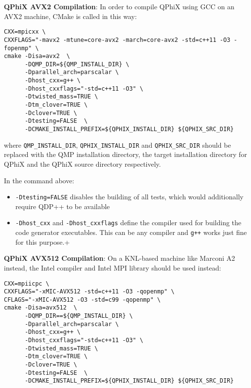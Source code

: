 \textbf{QPhiX AVX2 Compilation}: 
In order to compile QPhiX using GCC on an AVX2 machine, CMake is called in this way:
\begin{framed}
\begin{Verbatim}[fontsize=\small]
CXX=mpicxx \
CXXFLAGS="-mavx2 -mtune=core-avx2 -march=core-avx2 -std=c++11 -O3 -fopenmp" \
cmake -Disa=avx2  \
      -DQMP_DIR=${QMP_INSTALL_DIR} \
      -Dparallel_arch=parscalar \
      -Dhost_cxx=g++ \
      -Dhost_cxxflags="-std=c++11 -O3" \
      -Dtwisted_mass=TRUE \
      -Dtm_clover=TRUE \
      -Dclover=TRUE \
      -Dtesting=FALSE  \
      -DCMAKE_INSTALL_PREFIX=${QPHIX_INSTALL_DIR} ${QPHIX_SRC_DIR}
\end{Verbatim}
\end{framed}
where \texttt{QMP\_INSTALL\_DIR}, \texttt{QPHIX\_INSTALL\_DIR} and \texttt{QPHIX\_SRC\_DIR} should be replaced with the QMP installation directory, the target installation directory for QPhiX and the QPhiX source directory respectively.

In the command above:
\begin{itemize}
  \item{\texttt{-Dtesting=FALSE} disables the building of all tests, which would additionally require QDP++ to be available}
  \item{\texttt{-Dhost\_cxx} and \texttt{-Dhost\_cxxflags} define the compiler used for building the code generator executables. This can be any compiler and \texttt{g++} works just fine for this purpose.+}
\end{itemize}

\textbf{QPhiX AVX512 Compilation}: 
On a KNL-based machine like Marconi A2 instead, the Intel compiler and Intel MPI library should be used instead:
\begin{framed}
\begin{Verbatim}
CXX=mpiicpc \
CXXFLAGS="-xMIC-AVX512 -std=c++11 -O3 -qopenmp" \
CFLAGS="-xMIC-AVX512 -O3 -std=c99 -qopenmp" \
cmake -Disa=avx512  \
      -DQMP_DIR==${QMP_INSTALL_DIR} \
      -Dparallel_arch=parscalar \
      -Dhost_cxx=g++ \
      -Dhost_cxxflags="-std=c++11 -O3" \
      -Dtwisted_mass=TRUE \
      -Dtm_clover=TRUE \
      -Dclover=TRUE \
      -Dtesting=FALSE  \
      -DCMAKE_INSTALL_PREFIX=${QPHIX_INSTALL_DIR} ${QPHIX_SRC_DIR}
\end{Verbatim}
\end{framed}

